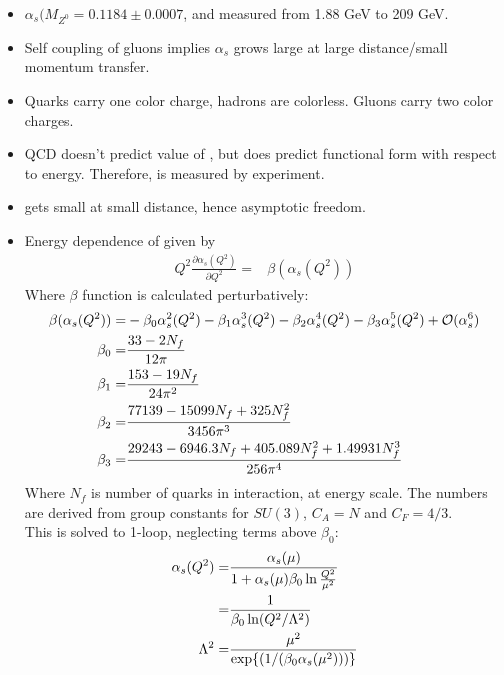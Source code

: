 \begin{itemize}
    \item $\alpha_s(M_{Z^0}=0.1184\pm0.0007$, and measured from 1.88 GeV to 209 GeV. \cite{bethke}
    \item Self coupling of gluons implies $\alpha_s$ grows large at large distance/small momentum transfer. \cite{bethke}
    \item Quarks carry one color charge, hadrons are colorless. Gluons carry two color charges. \cite{bethke}
    \item QCD doesn't predict value of \as, but does predict functional form with respect to energy. Therefore, is measured by experiment. \cite{bethke}
    \item \as gets small at small distance, hence asymptotic freedom. \cite{bethke}
    \item Energy dependence of \as given by \cite{bethke}
    \begin{equation}\begin{split}
    Q^2\frac{\partial\alpha_s(Q^2)}{\partial Q^2}=&\beta(\alpha_s(Q^2))
    \end{split}\end{equation}
    Where $\beta$ function is calculated perturbatively:
    \begin{equation}\begin{split}
    \beta(\alpha_s(Q^2))=&-\beta_0\alpha_s^2(Q^2)-\beta_1\alpha_s^3(Q^2)-\beta_2\alpha_s^4(Q^2)-\beta_3\alpha_s^5(Q^2)+\mathcal{O}(\alpha_s^6) \\
    \beta_0=&\frac{33-2N_f}{12\pi}\\
    \beta_1=&\frac{153-19N_f}{24\pi^2}\\
    \beta_2=&\frac{77139-15099N_f+325N_f^2}{3456\pi^3}\\
    \beta_3=&\frac{29243-6946.3N_f+405.089N_f^2+1.49931N_f^3}{256\pi^4}\\
    \end{split}\end{equation}
    Where $N_f$ is number of quarks in interaction, at energy scale. The numbers are derived from group constants for $SU(3)$, $C_A=N$ and $C_F=4/3$. \\
    This is solved to 1-loop, neglecting terms above $\beta_0$:
    \begin{equation}\begin{split}
    \as(Q^2)=&\frac{\as(\mu)}{1+\as(\mu)\beta_0\ln\frac{Q^2}{\mu^2}} \\
    =&\frac{1}{\beta_0\ln(Q^2/\Lambda^2)} \\
    \Lambda^2=&\frac{\mu^2}{\exp{(1/(\beta_0\as(\mu^2)))}} \\

\end{split}
\end{equation}
\end{itemize}
